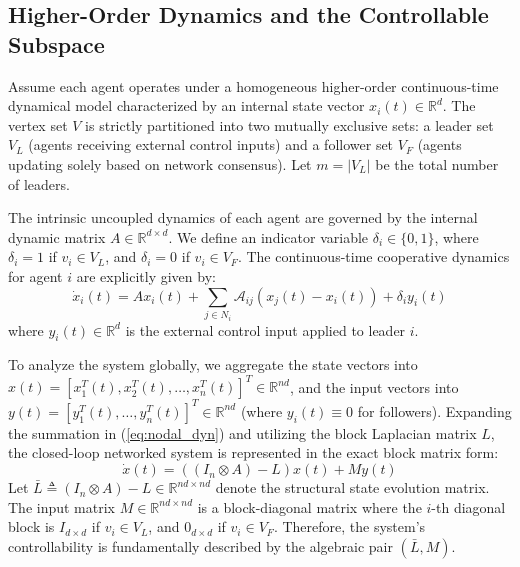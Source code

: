 \documentclass{IEEEtran}
\begin{document}
	\subsection{Higher-Order Dynamics and the Controllable Subspace}
	Assume each agent operates under a homogeneous higher-order continuous-time dynamical model characterized by an internal state vector $x_{i}(t) \in \mathbb{R}^{d}$. The vertex set $V$ is strictly partitioned into two mutually exclusive sets: a leader set $V_L$ (agents receiving external control inputs) and a follower set $V_F$ (agents updating solely based on network consensus). Let $m = |V_L|$ be the total number of leaders. 
	
	The intrinsic uncoupled dynamics of each agent are governed by the internal dynamic matrix $A \in \mathbb{R}^{d \times d}$. We define an indicator variable $\delta_i \in \{0, 1\}$, where $\delta_i = 1$ if $v_i \in V_L$, and $\delta_i = 0$ if $v_i \in V_F$. The continuous-time cooperative dynamics for agent $i$ are explicitly given by:
	\begin{equation}
		\dot{x}_{i}(t) = A x_{i}(t) + \sum_{j\in N_{i}} \mathcal{A}_{ij} (x_{j}(t) - x_{i}(t)) + \delta_i y_{i}(t) \label{eq:nodal_dyn}
	\end{equation}
	where $y_i(t) \in \mathbb{R}^d$ is the external control input applied to leader $i$. 
	
	To analyze the system globally, we aggregate the state vectors into $x(t) = [x_1^T(t), x_2^T(t), \dots, x_n^T(t)]^T \in \mathbb{R}^{nd}$, and the input vectors into $y(t) = [y_1^T(t), \dots, y_n^T(t)]^T \in \mathbb{R}^{nd}$ (where $y_i(t) \equiv 0$ for followers). Expanding the summation in (\ref{eq:nodal_dyn}) and utilizing the block Laplacian matrix $L$, the closed-loop networked system is represented in the exact block matrix form:
	\begin{equation}
		\dot{x}(t) = \left( (I_n \otimes A) - L \right) x(t) + M y(t) \label{eq:global_dyn}
	\end{equation}
	Let $\bar{L} \triangleq (I_n \otimes A) - L \in \mathbb{R}^{nd \times nd}$ denote the structural state evolution matrix. The input matrix $M \in \mathbb{R}^{nd \times nd}$ is a block-diagonal matrix where the $i$-th diagonal block is $I_{d \times d}$ if $v_i \in V_L$, and $0_{d \times d}$ if $v_i \in V_F$. Therefore, the system's controllability is fundamentally described by the algebraic pair $(\bar{L}, M)$.
	
\end{document}
